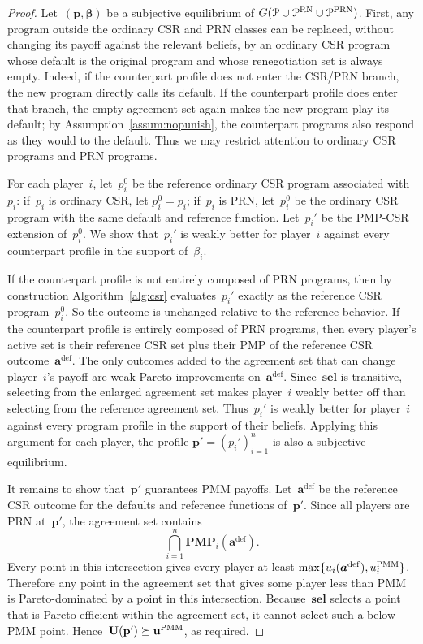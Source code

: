 \documentclass[sigconf]{aamas}
\newcommand{\allprogreneg}{\allprog^{\text{RN}}}
\newcommand{\prnsup}{\textnormal{PRN}}
\newcommand{\allprogprn}{\allprog^{\prnsup}}
\newcommand{\selection}{sel}%
\newcommand{\renegb}{\mathbf{\selection}}
\theoremstyle{definition}
\newcommand{\pmsup}{\textnormal{PMM}}%
\newcommand{\pmp}{\mathbf{PMP}}%
\newcommand{\yudproji}{\pmp_i}
\newcommand{\jointstrategy}{\boldsymbol{a}}
\newcommand{\pmm}{\fullpay^{\pmsup}}
\newcommand{\pmmi}{\payi^{\pmsup}}
\newcommand{\game}{G}
\newcommand{\progi}{\prog_i}
\newcommand{\allprog}{\mathcal{P}}
\newcommand{\fullprogpay}{\textbf{U}}
\newcommand{\fullpay}{\textbf{u}}
\newcommand{\fullact}{\jointstrategy}
\newcommand{\priorij}{\beta_i}%
\newcommand{\fullprog}{\textbf{\prog}}
\newcommand{\fullprior}{\boldsymbol{\beta}}%
\newcommand{\payi}{u_i}
\newcommand{\prog}{p}
\theoremstyle{definition}
\begin{document}
\pmmguarantee*

\begin{proof}
Let~$(\fullprog, \fullprior)$
be a subjective equilibrium
of $\game(\allprog \cup \allprogreneg \cup \allprogprn)$.
First, any program outside the ordinary CSR and PRN classes can be replaced,
without changing its payoff against the relevant beliefs,
by an ordinary CSR program whose default is the original program and whose
renegotiation set is always empty.
Indeed, if the counterpart profile does not enter the CSR/PRN branch, the new
program directly calls its default.
If the counterpart profile does enter that branch, the empty agreement set
again makes the new program play its default; by
Assumption~\ref{assum:nopunish}, the counterpart programs also respond as
they would to the default.
Thus we may restrict attention to ordinary CSR programs and PRN programs.

For each player~$i$, let~$\progi^0$ be the reference ordinary CSR program
associated with~$\progi$: if~$\progi$ is ordinary CSR, let
$\progi^0=\progi$; if~$\progi$ is PRN, let~$\progi^0$ be the ordinary CSR
program with the same default and reference function.
Let~$\progi'$ be the PMP-CSR extension of~$\progi^0$.
We show that~$\progi'$ is weakly better for player~$i$ against every
counterpart profile in the support of~$\priorij$.

If the counterpart profile is not entirely composed of PRN programs, then by
construction Algorithm~\ref{alg:csr} evaluates~$\progi'$ exactly as the
reference CSR program~$\progi^0$.
So the outcome is unchanged relative to the reference behavior.
If the counterpart profile is entirely composed of PRN programs, then every
player's active set is their reference CSR set plus their PMP of the reference
CSR outcome~$\fullact^{\mathrm{def}}$.
The only outcomes added to the agreement set that can change player~$i$'s
payoff are weak Pareto improvements on~$\fullact^{\mathrm{def}}$.
Since~$\renegb$ is transitive, selecting from the enlarged agreement set makes
player~$i$ weakly better off than selecting from the reference agreement set.
Thus~$\progi'$ is weakly better for player~$i$ against every program profile in
the support of their beliefs.
Applying this argument for each player, the profile
$\fullprog'=(\progi')_{i=1}^{n}$ is also a subjective equilibrium.

It remains to show that~$\fullprog'$ guarantees PMM payoffs.
Let~$\fullact^{\mathrm{def}}$ be the reference CSR outcome for the defaults
and reference functions of~$\fullprog'$.
Since all players are PRN at~$\fullprog'$, the agreement set contains
\[
    \bigcap_{i=1}^{n} \yudproji(\fullact^{\mathrm{def}}).
\]
Every point in this intersection gives every player at least
$\max\{\payi(\fullact^{\mathrm{def}}),\pmmi\}$.
Therefore any point in the agreement set that gives some player less than
PMM is Pareto-dominated by a point in this intersection.
Because~$\renegb$ selects a point that is Pareto-efficient within the
agreement set, it cannot select such a below-PMM point.
Hence~$\fullprogpay(\fullprog') \succeq \pmm$, as required.
\end{proof}
\end{document}

